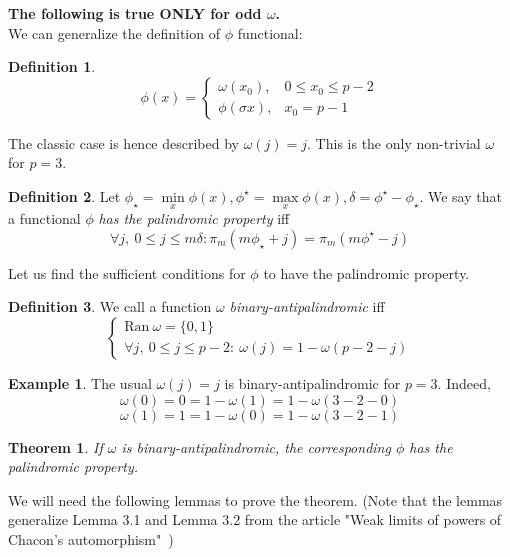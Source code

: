 \documentclass[a4paper]{article}
\theoremstyle{plain}
\newtheorem{theorem}{Theorem}
\theoremstyle{definition}
\newtheorem{definition}{Definition}
\newtheorem{example}{Example}
\begin{document}
\textbf{The following is true ONLY for odd $\omega$.\\}
We can generalize the definition of $\phi$ functional:
\begin{definition}
    $$
    \phi(x) = \begin{cases}
                    \omega(x_0), & 0 \le x_0 \le p - 2 \\
                    \phi(\sigma x), & x_0 = p - 1
                \end{cases}
    $$
\end{definition}
    The classic case is hence described by $\omega(j)=j$. This is the only non-trivial $\omega$ for $p=3$. \\
    
\begin{definition}
Let $\phi_\star = \min\limits_x \phi(x), \phi^\star = \max\limits_x \phi(x), \delta=\phi^\star - \phi_\star$. We say that a functional $\phi$  \textit{has the palindromic property} iff 
$$
\forall j,\ 0 \le j \le m\delta:   \pi_m(m\phi_\star + j)=\pi_m(m\phi^\star-j)
$$
\end{definition}
    
    Let us find the sufficient conditions for $\phi$ to have the palindromic property.
    
\begin{definition}
We call a function $\omega$  \textit{binary-antipalindromic} iff
\[\begin{cases}
	\mathrm{Ran }\ \omega = \{0,1\} \\
	\forall j,\ 0 \le j \le p-2: \  \omega(j) = 1 - \omega(p-2-j)
\end{cases}\]
\end{definition}


\begin{example}
The usual $\omega(j)=j$ is binary-antipalindromic for $p = 3$. Indeed,
$$
\omega(0) = 0 = 1 - \omega(1) = 1 - \omega(3 - 2 - 0)
$$
$$
\omega(1) = 1 = 1 - \omega(0) = 1 - \omega(3 - 2 - 1)
$$
\end{example}

\begin{theorem}
If $\omega$ is binary-antipalindromic, the corresponding $\phi$ has the palindromic property.
\end{theorem}

We will need the following lemmas to prove the theorem. (Note that the lemmas generalize Lemma 3.1 and Lemma 3.2 from the article "Weak limits of powers of Chacon's automorphism"\ )
\end{document}
